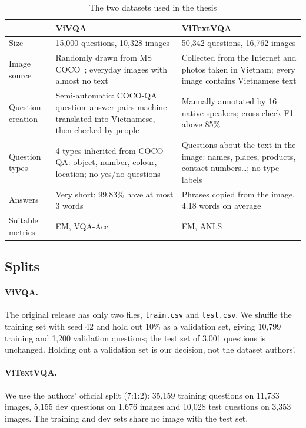 \begin{table}[htbp]
\caption{The two datasets used in the thesis}
\label{tab:met-datasets}
\centering
\small
\begin{tabular}{p{}p{}p{}}
\toprule
\raggedright & \textbf{ViVQA}~\cite{tran2021vivqa} & \raggedright \textbf{ViTextVQA}~\cite{nguyen2024vitextvqa} \tabularnewline
\midrule
\raggedright Size & \raggedright 15,000 questions, 10,328 images & \raggedright 50,342 questions, 16,762 images \tabularnewline
Image source & Randomly drawn from MS COCO~\cite{lin2014coco}; everyday images with almost no text &
Collected from the Internet and photos taken in Vietnam; every image contains Vietnamese text \\
Question creation & Semi-automatic: COCO-QA~\cite{ren2015cocoqa} question--answer pairs machine-translated into Vietnamese, then checked by people &
Manually annotated by 16 native speakers; cross-check F1 above 85\% \\
Question types & 4 types inherited from COCO-QA: object, number, colour, location; no yes/no questions &
Questions about the text in the image: names, places, products, contact numbers\ldots; no type labels \\
\raggedright Answers & \raggedright Very short: 99.83\% have at most 3 words & \raggedright Phrases copied from the image, 4.18 words on average \tabularnewline
\raggedright Suitable metrics & \raggedright EM, VQA-Acc & \raggedright EM, ANLS \tabularnewline
\bottomrule
\end{tabular}
\end{table}

\subsection{Splits}
\label{sec:met-split}

\paragraph{ViVQA.} The original release has only two files, \texttt{train.csv} and
\texttt{test.csv}. We shuffle the training set with seed 42 and hold out 10\%
as a validation set, giving 10,799 training and 1,200 validation questions; the test set
of 3,001 questions is unchanged. Holding out a validation set is our decision,
not the dataset authors'.

\paragraph{ViTextVQA.} We use the authors' official split (7:1:2): 35,159
training questions on 11,733 images, 5,155 dev questions on 1,676 images and 10,028
test questions on 3,353 images. The training and dev sets share no image with the test
set.

